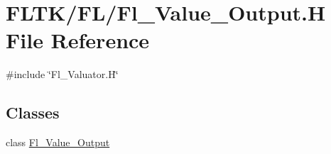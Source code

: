 \hypertarget{_fl___value___output_8_h}{}\section{F\+L\+T\+K/\+F\+L/\+Fl\+\_\+\+Value\+\_\+\+Output.H File Reference}
\label{_fl___value___output_8_h}
{\ttfamily \#include \char`\"{}Fl\+\_\+\+Valuator.\+H\char`\"{}}\newline
\subsection*{Classes}
\begin{DoxyCompactItemize}
\item 
class \hyperlink{class_fl___value___output}{Fl\+\_\+\+Value\+\_\+\+Output}
\end{DoxyCompactItemize}
